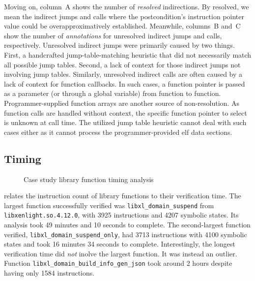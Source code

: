 Moving on, column~A shows the number of \emph{resolved} indirections.
By resolved, we mean the indirect jumps and calls where the postcondition's instruction pointer value could be overapproximatively established.
Meanwhile, columns~B and~C show the number of \emph{annotations} for unresolved indirect jumps and calls, respectively.
Unresolved indirect jumps were primarily caused by two things.
First, a handcrafted jump-table-matching heuristic that did not necessarily match all possible jump tables.
Second, a lack of context for those indirect jumps not involving jump tables.
Similarly, unresolved indirect calls are often caused by a lack of context for function callbacks.
In such cases, a function pointer is passed as a parameter (or through a global variable) from function to function.
Programmer-supplied function arrays are another source of non-resolution.
As function calls are handled without context, the specific function pointer to select is unknown at call time.
The utilized jump table heuristic cannot deal with such cases either as it cannot process the programmer-provided \ac{elf} data sections.

\subsection{Timing}\label{sec:timing}
\begin{figure}
  \caption{Case study library function timing analysis}\label{fig:distr}
\end{figure}
 relates the instruction count of library functions to their verification time.
The largest function successfully verified was \lstinline|libxl_domain_suspend| from \lstinline|libxenlight.so.4.12.0|, with \num{3925} instructions and \num{4207} symbolic states.
Its analysis took \num{49} minutes and \num{10} seconds to complete.
The second-largest function verified, \lstinline|libxl_domain_suspend_only|, had \num{3713} instructions with \num{4100} symbolic states and took \num{16} minutes \num{34} seconds to complete.
Interestingly, the longest verification time did \emph{not} inolve the largest function.
It was instead an outlier.
Function \lstinline|libxl_domain_build_info_gen_json| took around \num{2} hours despite having only \num{1584} instructions.

